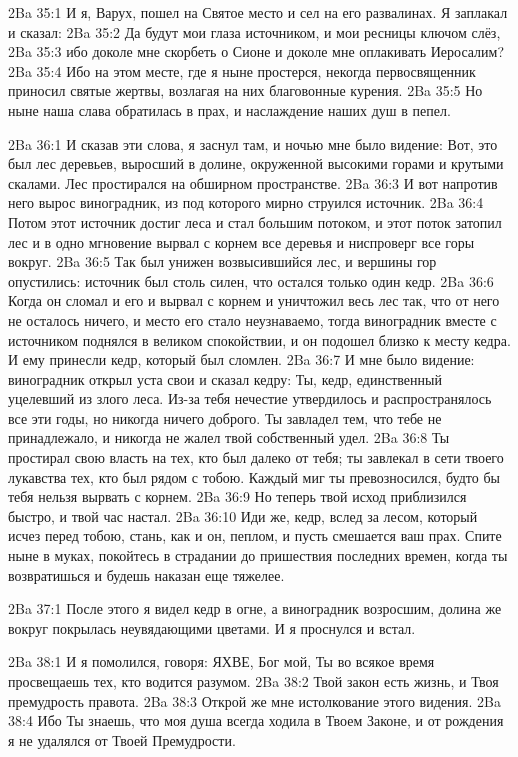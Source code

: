 \vs 2Ba 35:1
И я, Варух, пошел на Святое место и сел на его развалинах. Я заплакал и сказал:
\vs 2Ba 35:2
Да будут мои глаза источником, и мои ресницы ключом слёз,
\vs 2Ba 35:3
ибо доколе мне скорбеть о Сионе и доколе мне оплакивать Иеросалим?
\vs 2Ba 35:4
Ибо на этом месте, где я ныне простерся, некогда первосвященник приносил святые жертвы, возлагая на них благовонные курения.
\vs 2Ba 35:5
Но ныне наша слава обратилась в прах, и наслаждение наших душ в пепел.

\vs 2Ba 36:1
И сказав эти слова, я заснул там, и ночью мне было видение: Вот, это был лес деревьев, выросший в долине, окруженной высокими горами и крутыми скалами. Лес простирался на обширном пространстве.
\vs 2Ba 36:3
И вот напротив него вырос виноградник, из под которого мирно струился источник.
\vs 2Ba 36:4
Потом этот источник достиг леса и стал большим потоком, и этот поток затопил лес и в одно мгновение вырвал с корнем все деревья и ниспроверг все горы вокруг.
\vs 2Ba 36:5
Так был унижен возвысившийся лес, и вершины гор опустились: источник был столь силен, что остался только один кедр.
\vs 2Ba 36:6
Когда он сломал и его и вырвал с корнем и уничтожил весь лес так, что от него не осталось ничего, и место его стало неузнаваемо, тогда виноградник вместе с источником поднялся в великом спокойствии, и он подошел близко к месту кедра. И ему принесли кедр, который был сломлен.
\vs 2Ba 36:7
И мне было видение: виноградник открыл уста свои и сказал кедру: Ты, кедр, единственный уцелевший из злого леса. Из-за тебя нечестие утвердилось и распространялось все эти годы, но никогда ничего доброго. Ты завладел тем, что тебе не принадлежало, и никогда не жалел твой собственный удел.
\vs 2Ba 36:8
Ты простирал свою власть на тех, кто был далеко от тебя; ты завлекал в сети твоего лукавства тех, кто был рядом с тобою. Каждый миг ты превозносился, будто бы тебя нельзя вырвать с корнем.
\vs 2Ba 36:9
Но теперь твой исход приблизился быстро, и твой час настал.
\vs 2Ba 36:10
Иди же, кедр, вслед за лесом, который исчез перед тобою, стань, как и он, пеплом, и пусть смешается ваш прах. Спите ныне в муках, покойтесь в страдании до пришествия последних времен, когда ты возвратишься и будешь наказан еще тяжелее.

\vs 2Ba 37:1
После этого я видел кедр в огне, а виноградник возросшим, долина же вокруг покрылась неувядающими цветами. И я проснулся и встал.

\vs 2Ba 38:1
И я помолился, говоря: ЯХВЕ, Бог мой, Ты во всякое время просвещаешь тех, кто водится разумом.
\vs 2Ba 38:2
Твой закон есть жизнь, и Твоя премудрость правота.
\vs 2Ba 38:3
Открой же мне истолкование этого видения.
\vs 2Ba 38:4
Ибо Ты знаешь, что моя душа всегда ходила в Твоем Законе, и от рождения я не удалялся от Твоей Премудрости.

